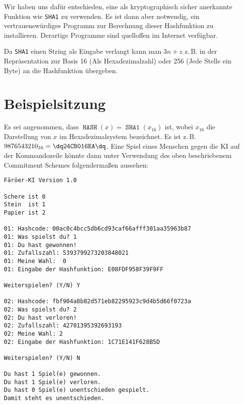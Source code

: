 \documentclass{scrartcl}
\newcommand{\SHAone}{\texttt{SHA1}}
\DeclareMathOperator{\hash}{\texttt{HASH}}
\begin{document}
Wir haben uns dafür entschieden, eine als kryptographisch sicher anerkannte
Funktion wie \SHAone{} zu verwenden. Es ist dann aber notwendig, ein
vertrauenswürdiges Programm zur Berechnung dieser Hashfunktion zu installieren.
Derartige Programme sind quelloffen im Internet verfügbar.

Da \SHAone{} einen String als Eingabe verlangt kann man $3n+z$ z.\,B. in der
Repräsentation zur Basis 16 (Als Hexadezimalzahl) oder 256 (Jede Stelle ein
Byte) an die Hashfunktion übergeben.

\section{Beispielsitzung}

Es sei angenommen, dass $\hash(x) = \mathop{\SHAone}(x_{16})$ ist, wobei
$x_{16}$ die Darstellung von $x$ im Hexadezimalsystem bezeichnet. Es ist z.\,B.
$9876543210_{16} = \texttt{\dq24CB016EA\dq}$. Eine Spiel eines Menschen gegen
die KI auf der Kommandozeile könnte dann unter Verwendung des oben beschriebenem
Commitment Schemes folgendermaßen aussehen:

\begin{verbatim}
Färöer-KI Version 1.0

Schere ist 0
Stein  ist 1
Papier ist 2

01: Hashcode: 00ac0c4bcc5db6cd93caf66afff301aa35963b87
01: Was spielst du? 1
01: Du hast gewonnen!
01: Zufallszahl: 5393799273203848021
01: Meine Wahl:  0
01: Eingabe der Hashfunktion: E08FDF958F39F9FF

Weiterspielen? (Y/N) Y

02: Hashcode: fbf904a8b82d571eb82295923c9d4b5d66f0723a
02: Was spielst du? 2
02: Du hast verloren!
02: Zufallszahl: 42701395392693193
02: Meine Wahl: 2
02: Eingabe der Hashfunktion: 1C71E141F628B5D

Weiterspielen? (Y/N) N

Du hast 1 Spiel(e) gewonnen.
Du hast 1 Spiel(e) verloren.
Du hast 0 Spiel(e) unentschieden gespielt.
Damit steht es unentschieden.
\end{verbatim}
\end{document}
